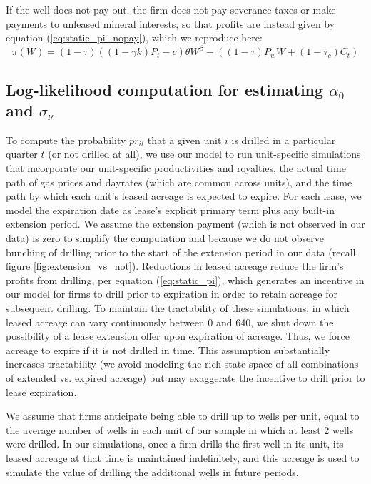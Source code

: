 \documentclass[12pt]{article}
\begin{document}
If the well does not pay out, the firm does not pay severance taxes or make payments to unleased mineral interests, so that profits are instead given by equation (\ref{eq:static_pi_nopay}), which we reproduce here:
\begin{equation}
\pi(W) = (1-\tau)((1-\gamma k)P_t-c)\theta W^{\beta} - ((1-\tau) P_w W + (1-\tau_c) C_t) 
\end{equation}



\subsection{Log-likelihood computation for estimating $\alpha_0$ and $\sigma_\nu$}

To compute the probability $pr_{it}$ that a given unit $i$ is drilled in a particular quarter $t$ (or not drilled at all), we use our model to run unit-specific simulations that incorporate our unit-specific productivities and royalties, the actual time path of gas prices and dayrates (which are common across units), and the time path by which each unit's leased acreage is expected to expire. For each lease, we model the expiration date as lease's explicit primary term plus any built-in extension period. We assume the extension payment (which is not observed in our data) is zero to simplify the computation and because we do not observe bunching of drilling prior to the start of the extension period in our data (recall figure \ref{fig:extension_vs_not}). Reductions in leased acreage reduce the firm's profits from drilling, per equation (\ref{eq:static_pi}), which generates an incentive in our model for firms to drill prior to expiration in order to retain acreage for subsequent drilling. To maintain the tractability of these simulations, in which leased acreage can vary continuously between 0 and 640, we shut down the possibility of a lease extension offer upon expiration of acreage. Thus, we force acreage to expire if it is not drilled in time. This assumption substantially increases tractability (we avoid modeling the rich state space of all combinations of extended vs. expired acreage) but may exaggerate the incentive to drill prior to lease expiration. 

We assume that firms anticipate being able to drill up to wells per unit, equal to the average number of wells in each unit of our sample in which at least 2 wells were drilled. In our simulations, once a firm drills the first well in its unit, its leased acreage at that time is maintained indefinitely, and this acreage is used to simulate the value of drilling the additional wells in future periods.
\end{document}
